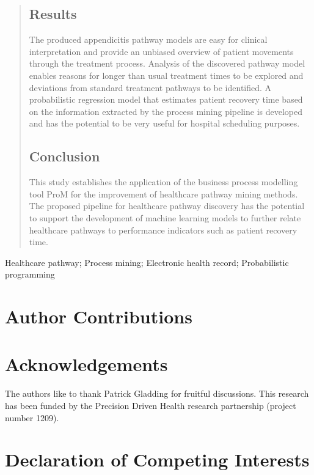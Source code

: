 \documentclass{elsarticle}
\begin{document}
\begin{frontmatter}
\begin{abstract}
\subsection*{Results}
The produced appendicitis pathway models are
easy for clinical interpretation and provide an unbiased overview of patient movements through the treatment process. Analysis of the discovered pathway model enables reasons for longer than usual treatment times to be explored and deviations from standard treatment pathways to be identified. A probabilistic regression model that estimates patient recovery time based on the information extracted by the process mining pipeline is developed and has the potential to be very useful for hospital scheduling purposes.

\subsection*{Conclusion}
This study establishes the application of the business process modelling tool ProM for the improvement of healthcare pathway mining methods. 
The proposed pipeline for healthcare pathway discovery  has the potential to support the development of machine learning models to further relate healthcare pathways to performance indicators such as patient recovery time. 

\end{abstract}

\begin{keyword}
Healthcare pathway; Process mining; Electronic health record; Probabilistic programming
\end{keyword}

\end{frontmatter}

\linenumbers



\section*{Author Contributions}


\section*{Acknowledgements}
The authors like to thank Patrick Gladding for fruitful discussions.
This research has been funded by the Precision Driven Health research partnership (project number 1209).


\section*{Declaration of Competing Interests}



%
\end{document}
